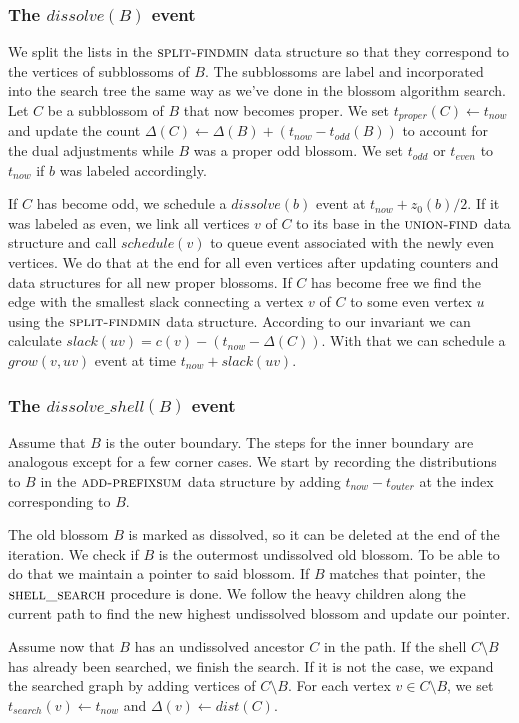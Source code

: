 \subsubsection*{The $dissolve(B)$ event} 
We split the lists in the $\textsc{split-findmin}$ data structure so that they correspond to the vertices of subblossoms of $B$. The subblossoms are label and incorporated into the search tree the same way as we've done in the blossom algorithm search. Let $C$ be a subblossom of $B$ that now becomes proper. We set $t_{proper}(C) \gets t_{now}$ and update the count $\Delta(C) \gets \Delta(B) + (t_{now} - t_{odd}(B))$ to account for the dual adjustments while $B$ was a proper odd blossom. We set $t_{odd}$ or $t_{even}$ to $t_{now}$ if $b$ was labeled accordingly. 

If $C$ has become odd, we schedule a $dissolve(b)$ event at $t_{now} + z_0(b) / 2$. If it was labeled as even, we link all vertices $v$ of $C$ to its base in the $\textsc{union-find}$ data structure and call $schedule(v)$ to queue event associated with the newly even vertices. We do that at the end for all even vertices after updating counters and data structures for all new proper blossoms. If $C$ has become free we find the edge with the smallest slack connecting a vertex $v$ of $C$ to some even vertex $u$ using the $\textsc{split-findmin}$ data structure. According to our invariant we can calculate $slack(uv) = c(v) - (t_{now} - \Delta(C))$. With that we can schedule a $grow(v, uv)$ event at time $t_{now} + slack(uv)$. 

\subsubsection*{The $dissolve\_shell(B)$ event}
Assume that $B$ is the outer boundary. The steps for the inner boundary are analogous except for a few corner cases. We start by recording the distributions to $B$ in the $\textsc{add-prefixsum}$ data structure by adding $t_{now} - t_{outer}$ at the index corresponding to $B$.

The old blossom $B$ is marked as dissolved, so it can be deleted at the end of the iteration. We check if $B$ is the outermost undissolved old blossom. To be able to do that we maintain a pointer to said blossom. If $B$ matches that pointer, the $\textsc{shell\_search}$ procedure is done. We follow the heavy children along the current path to find the new highest undissolved blossom and update our pointer.

Assume now that $B$ has an undissolved ancestor $C$ in the path. If the shell $C \setminus B$ has already been searched, we finish the search. If it is not the case, we expand the searched graph by adding vertices of $C \setminus B$. For each vertex $v \in C \setminus B$, we set $t_{search}(v) \gets t_{now}$ and $\Delta(v) \gets dist(C)$.


